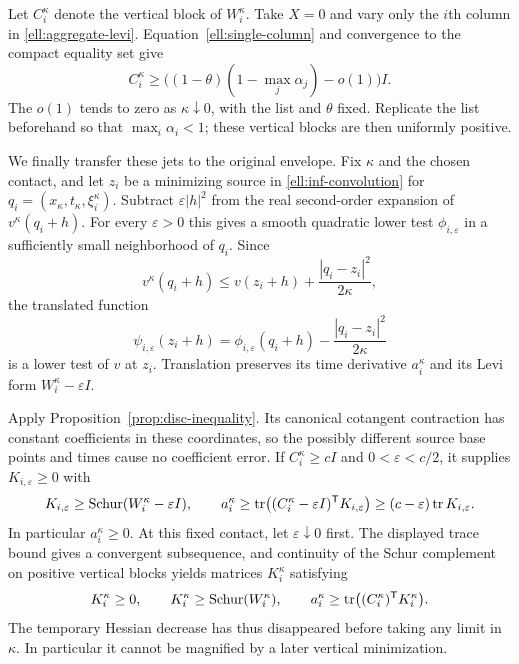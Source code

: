 Let $C_i^\kappa$ denote the vertical block of $W_i^\kappa$.
Take $X=0$ and vary only the $i$th column in
\eqref{ell:aggregate-levi}.  Equation~\eqref{ell:single-column}
and convergence to the compact equality set give
\begin{equation}\label{ell:vertical-positive}
 C_i^\kappa\ge
 \bigl((1-\theta)(1-\max_j\alpha_j)-o(1)\bigr)I.
\end{equation}
The $o(1)$ tends to zero as $\kappa\downarrow0$, with the list and
$\theta$ fixed.  Replicate the list beforehand so that
$\max_i\alpha_i<1$; these vertical blocks are then uniformly positive.

We finally transfer these jets to the original envelope.  Fix
$\kappa$ and the chosen contact, and let $z_i$ be a minimizing source
in \eqref{ell:inf-convolution} for
$q_i=(x_\kappa,t_\kappa,\xi_i^\kappa)$.
Subtract $\varepsilon|h|^2$ from the real second-order expansion of
$v^\kappa(q_i+h)$.  For every $\varepsilon>0$ this gives a smooth
quadratic lower test $\phi_{i,\varepsilon}$ in a sufficiently small
neighborhood of $q_i$.  Since
\[
 v^\kappa(q_i+h)
 \le v(z_i+h)+\frac{|q_i-z_i|^2}{2\kappa},
\]
the translated function
\begin{equation}\label{ell:translated-test}
 \psi_{i,\varepsilon}(z_i+h)
 =\phi_{i,\varepsilon}(q_i+h)
       -\frac{|q_i-z_i|^2}{2\kappa}
\end{equation}
is a lower test of $v$ at $z_i$.  Translation preserves its time
derivative $a_i^\kappa$ and its Levi form
$W_i^\kappa-\varepsilon I$.

Apply Proposition~\ref{prop:disc-inequality}.  Its canonical
cotangent contraction has constant coefficients in these coordinates,
so the possibly different source base points and times cause no
coefficient error.  If $C_i^\kappa\ge cI$ and $0<\varepsilon<c/2$,
it supplies $K_{i,\varepsilon}\ge0$ with
\[
 K_{i,\varepsilon}\ge\operatorname{Schur}(W_i^\kappa-\varepsilon I),
 \qquad
 a_i^\kappa\ge
 \operatorname{tr}\bigl((C_i^\kappa-\varepsilon I)^{\mathsf T}
                  K_{i,\varepsilon}\bigr)
 \ge(c-\varepsilon)\operatorname{tr} K_{i,\varepsilon}.
\]
In particular $a_i^\kappa\ge0$.  At this fixed contact, let
$\varepsilon\downarrow0$ first.  The displayed trace bound gives a
convergent subsequence, and continuity of the Schur complement on
positive vertical blocks yields matrices $K_i^\kappa$ satisfying
\begin{equation}\label{ell:transferred-inequality}
 K_i^\kappa\ge0,\qquad
 K_i^\kappa\ge\operatorname{Schur}(W_i^\kappa),\qquad
 a_i^\kappa\ge\operatorname{tr}\bigl((C_i^\kappa)^{\mathsf T}K_i^\kappa\bigr).
\end{equation}
The temporary Hessian decrease has thus disappeared before taking
any limit in $\kappa$.  In particular it cannot be magnified by a
later vertical minimization.

